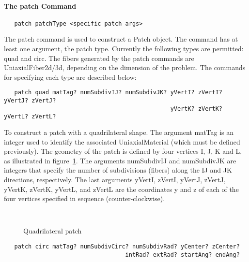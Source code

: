 \documentclass[12pt]{article}
\begin{document}
\paragraph{The patch Command}

{\sf\small
\begin{verbatim}
   patch patchType <specific patch args>
\end{verbatim}
}

The patch command is used to construct a Patch object. 
The command has at least one argument, the patch type. Currently 
the following types are permitted: quad and circ. The fibers
generated by the patch commands are UniaxialFiber2d/3d, depending on
the dimension of the problem. The commands
for specifying each type are described below:

{\sf\small
\begin{verbatim}
   patch quad matTag? numSubdivIJ? numSubdivJK? yVertI? zVertI? yVertJ? zVertJ? 
                                                yVertK? zVertK? yVertL? zVertL?

\end{verbatim}
}

\noindent To construct a patch with a quadrilateral shape. The
argument matTag is an integer used to identify the associated
UniaxialMaterial (which must be defined previously). The geometry of 
the patch is defined by four vertices I, J, K and L, as illustrated
in figure~\ref{quadPatch}. The arguments numSubdivIJ and numSubdivJK are integers
that specify the number of subdivisions (fibers) along the IJ and JK 
directions, respectively. The last arguments yVertI, zVertI, yVertJ,
zVertJ, yVertK, zVertK, yVertL, and zVertL
are the coordinates y and z of each of the four vertices specified in sequence
(counter-clockwise).
 


\begin{figure}[htpb]
\begin{center}
\leavevmode
\hbox{%
}
\end{center}
\caption{Quadrilateral patch}
\label{quadPatch}
\end{figure}


{\sf\small
\begin{verbatim}
   patch circ matTag? numSubdivCirc? numSubdivRad? yCenter? zCenter? 
                                   intRad? extRad? startAng? endAng?
\end{verbatim}
}
\end{document}
